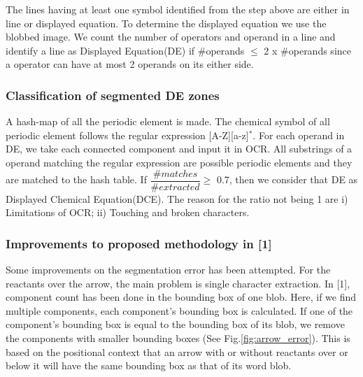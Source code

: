 \documentclass[conference]{IEEEtran}
\begin{document}
The lines having at least one symbol identified from the step above are either in line or displayed equation. To determine the displayed equation we use the blobbed image. We count the number of operators and operand in a line and identify a line as Displayed Equation(DE) if \#operands $\leq$ 2 x \#operands since a operator can have at most 2 operands on its either side. 

\subsubsection{Classification of segmented DE zones}

A hash-map of all the periodic element is made. The chemical symbol of all periodic element follows the regular expression [A-Z][a-z]$^{*}$. For each operand in DE, we take each connected component and input it in OCR. All substrings of a operand matching the regular expression are possible periodic elements and they are matched to the hash table. If $\dfrac{\#matches}{\#extracted} \geq$ 0.7, then we consider that DE as Displayed Chemical Equation(DCE). The reason for the ratio not being 1 are i) Limitations of OCR; ii) Touching and broken characters.  
  
\subsubsection{Improvements to proposed methodology in [1]}

Some improvements on the segmentation error has been attempted. 
For the reactants over the arrow, the main problem is single character extraction. In [1], component count has been done in the bounding box of one blob. Here, if we find multiple components, each component's bounding box is calculated. If one of the component's bounding box is equal to the bounding box of its blob, we remove the components with smaller bounding boxes  (See Fig.\ref{fig:arrow_error}). This is based on the positional context that an arrow with or without reactants over or below it will have the same bounding box as that of its word blob. 
\end{document}
